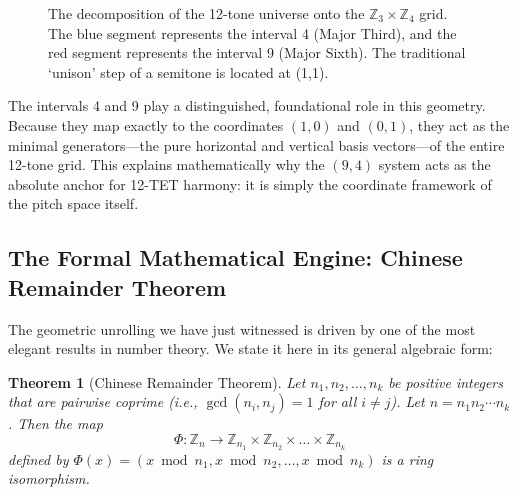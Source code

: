 \documentclass[11pt,letterpaper]{amsart}
\newcommand{\Z}{\mathbb{Z}}
\newtheorem{theorem}{Theorem}
\begin{document}
\begin{figure}[H]
    \caption{The decomposition of the 12-tone universe onto the $\Z_3 \times \Z_4$ grid. The blue segment represents the interval {\color{blue}4} (Major Third), and the red segment represents the interval {\color{red}9} (Major Sixth). The traditional `unison' step of a semitone is located at {\color{crtgold}(1,1)}.}
    \label{fig:crt_grid_12tet}
\end{figure}

The intervals 4 and 9 play a distinguished, foundational role in this geometry. Because they map exactly to the coordinates $(1,0)$ and $(0,1)$, they act as the minimal generators---the pure horizontal and vertical basis vectors---of the entire 12-tone grid. This explains mathematically why the $(9,4)$ system acts as the absolute anchor for 12-TET harmony: it is simply the coordinate framework of the pitch space itself.

\subsection{The Formal Mathematical Engine: Chinese Remainder Theorem}

The geometric unrolling we have just witnessed is driven by one of the most elegant results in number theory. We state it here in its general algebraic form:

\begin{theorem}[Chinese Remainder Theorem]
Let $n_1, n_2, \dots, n_k$ be positive integers that are pairwise coprime (i.e., $\gcd(n_i, n_j) = 1$ for all $i \neq j$). Let $n = n_1 n_2 \cdots n_k$. Then the map
\begin{equation}
    \Phi: \Z_n \longrightarrow \Z_{n_1} \times \Z_{n_2} \times \dots \times \Z_{n_k}
\end{equation}
defined by $\Phi(x) = (x \bmod n_1, x \bmod n_2, \dots, x \bmod n_k)$ is a ring isomorphism.
\end{theorem}
\end{document}
